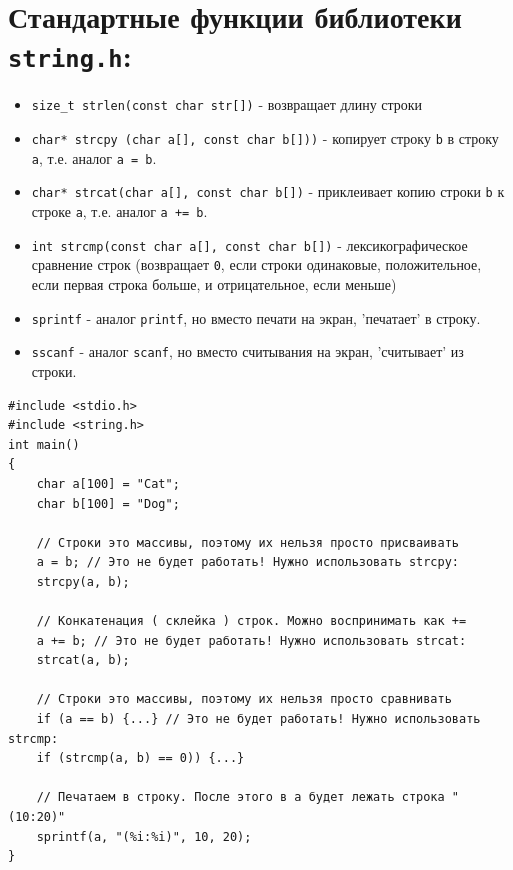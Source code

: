 \documentclass{article}
\begin{document}
\section*{Стандартные функции библиотеки \texttt{string.h}:}
\begin{itemize}
\item \texttt{size\_t strlen(const char str[])} - возвращает длину строки
\item \texttt{char* strcpy (char a[], const char b[]))} - копирует строку \texttt{b} в строку \texttt{a}, т.е. аналог \texttt{a = b}.
\item \texttt{char* strcat(char a[], const char b[])} - приклеивает копию строки \texttt{b} к строке \texttt{a}, т.е. аналог \texttt{a += b}.
\item \texttt{int strcmp(const char a[], const char b[])} - лексикографическое сравнение строк (возвращает \texttt{0}, если строки одинаковые, положительное, если первая строка больше, и отрицательное, если меньше)
\item \texttt{sprintf} - аналог \texttt{printf}, но вместо печати на экран, 'печатает' в строку.
\item \texttt{sscanf} - аналог \texttt{scanf}, но вместо считывания на экран, 'считывает' из строки.
\end{itemize}
\begin{lstlisting}
#include <stdio.h>
#include <string.h>
int main() 
{
    char a[100] = "Cat";
    char b[100] = "Dog";
	
    // Строки это массивы, поэтому их нельзя просто присваивать 
    a = b; // Это не будет работать! Нужно использовать strcpy:
    strcpy(a, b);
    
    // Конкатенация ( склейка ) строк. Можно воспринимать как +=
    a += b; // Это не будет работать! Нужно использовать strcat:
    strcat(a, b);
	
    // Строки это массивы, поэтому их нельзя просто сравнивать
    if (a == b) {...} // Это не будет работать! Нужно использовать strcmp:
    if (strcmp(a, b) == 0)) {...} 
    
    // Печатаем в строку. После этого в a будет лежать строка "(10:20)"
    sprintf(a, "(%i:%i)", 10, 20);
}
\end{lstlisting}
\end{document}
